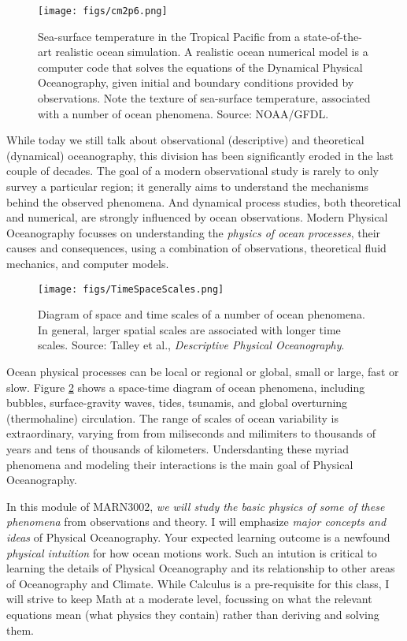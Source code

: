 \documentclass[11pt]{article}
\newcommand{\PO}{Physical Oceanography}
\begin{document}
\begin{figure}[ht]\label{cm2p6}
\centering
\texttt{[image: figs/cm2p6.png]}
\caption{\small Sea-surface temperature in the Tropical Pacific from a state-of-the-art
realistic ocean simulation. A realistic ocean numerical model is a computer code that solves
the equations of the Dynamical \PO, given initial and boundary conditions provided
by observations. Note the texture of sea-surface temperature, associated with a number of ocean
phenomena. Source: NOAA/GFDL.}
\end{figure}


While today we still talk about observational (descriptive) and theoretical
(dynamical) oceanography, this division has been significantly eroded in the
last couple of decades. The goal of a modern observational study is rarely to only survey a particular region; it generally aims to understand the mechanisms behind the observed phenomena. And dynamical process studies,
both theoretical and numerical, are strongly influenced by ocean observations. Modern
Physical Oceanography focusses on understanding the \emph{physics of ocean processes},
their causes and consequences, using a combination of observations, theoretical
fluid mechanics,  and computer models.

\begin{figure}[ht]\label{scales}
\centering
\texttt{[image: figs/TimeSpaceScales.png]}
\caption{\small Diagram of space and time scales of a number of ocean phenomena.
In general, larger spatial
scales are associated with longer time scales. Source: Talley et al., \textit{Descriptive Physical Oceanography}.}
\end{figure}

Ocean physical processes can be local or regional or global, small or large, fast
or slow. Figure \ref{scales} shows a space-time diagram of ocean phenomena, including
bubbles, surface-gravity waves, tides, tsunamis, and global overturning
(thermohaline) circulation. The range of scales of ocean variability is extraordinary,
varying from from miliseconds and milimiters to thousands of years and tens of thousands of
kilometers. Undersdanting these myriad phenomena and modeling their interactions is
the main goal of Physical Oceanography.

In this module of MARN3002, \emph{we will study the basic physics of some of these phenomena
} from observations and theory. I will emphasize \emph{major concepts and ideas} of \PO. Your
expected learning outcome is a newfound \emph{physical intuition} for how ocean motions work. Such an intution is critical to learning the details of \PO{} and its relationship to other areas of Oceanography
and Climate. While Calculus is a pre-requisite for this
class, I will strive to keep Math at a moderate level, focussing on what the relevant equations mean (what physics they contain) rather than deriving and solving them.
\end{document}
